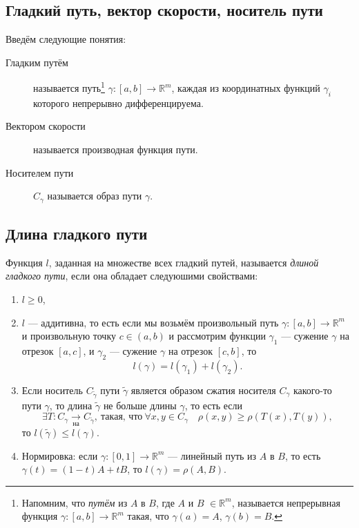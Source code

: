 \subsection{Гладкий путь, вектор скорости, носитель пути}

\begin{definition}
	Введём следующие понятия:
	\begin{description}
		\item[Гладким путём] называется путь\footnote{Напомним, что \textit{путём} из \(A\) в \(B\), где \(A\) и \(B\) \(\in \mathbb{R}^m\), называется непрерывная функция \(\gamma \colon [a, b] \to \mathbb{R}^m\) такая, что \(\gamma(a) = A\), \(\gamma(b) = B\).} \(\gamma \colon [a, b] \to \mathbb{R}^m\), каждая из координатных функций \(\gamma_i\) которого непрерывно дифференцируема.
		\item[Вектором скорости] называется производная функция пути.
		\item[Носителем пути] \(C_\gamma\) называется образ пути \(\gamma\).
	\end{description}
\end{definition}

\subsection{Длина гладкого пути}

\begin{definition}
	Функция \(l\), заданная на множестве всех гладкий путей, называется \textit{длиной гладкого пути}, если она обладает следуюшими свойствами:
	\begin{enumerate}
		\item \(l \geqslant 0\),
		\item \label{way2} \(l\) --- аддитивна, то есть если мы возьмём произвольный путь \(\gamma \colon [a, b] \to \mathbb{R}^m\) и произвольную точку \(c \in (a, b)\) и рассмотрим функции \(\gamma_1\) --- сужение \(\gamma\) на отрезок \([a, c]\), и \(\gamma_2\) --- сужение \(\gamma\) на отрезок \([c, b]\), то \[
		l(\gamma) = l(\gamma_1) + l(\gamma_2).
		\]
		\item \label{way3}Если носитель \(C_{\widetilde{\gamma}}\) пути \(\widetilde{\gamma}\) является образом сжатия носителя \(C_\gamma\) какого-то пути \(\gamma\), то длина 	\(\widetilde{\gamma}\) не больше длины \(\gamma\), то есть если \[
		\exists T \colon C_\gamma \xrightarrow[\text{на}]{} C_{\widetilde{\gamma}}, \ \textit{такая, что} \ \forall x, y \in C_\gamma \quad \rho(x, y) \geqslant \rho(T(x), T(y)),
		\]
		то \(l(\widetilde{\gamma}) \leqslant l(\gamma)\).
		\item Нормировка: если \(\gamma \colon [0, 1] \to \mathbb{R}^m\) --- линейный путь из \(A\) в \(B\), то есть \(\gamma(t) = (1 - t)A + tB\), то \(l(\gamma) = \rho(A, B)\).
	\end{enumerate}
\end{definition}

